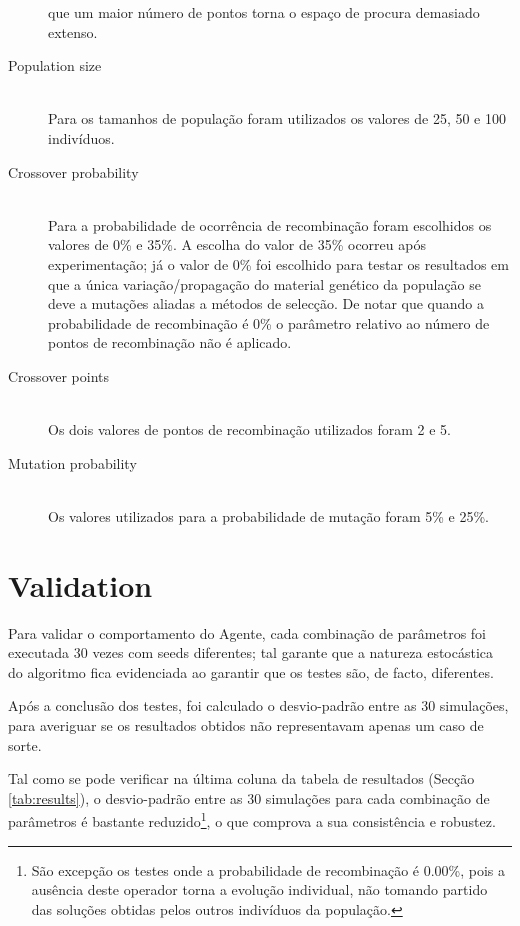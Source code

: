 \documentclass[a4paper]{article}
\begin{document}
\begin{description}
		que um maior número de pontos torna o espaço de procura demasiado extenso.
	\item [Population size] \hfill \\
		\indent Para os tamanhos de população foram utilizados os valores de 25, 50 e 100 indivíduos. %
	\item [Crossover probability] \hfill \\
		\indent Para a probabilidade de ocorrência de recombinação foram escolhidos os valores de 0\% e 35\%. A escolha do valor de 35\% ocorreu após
		experimentação; já o valor de 0\% foi escolhido para testar os resultados em que a única variação/propagação do material genético da população se deve
		a mutações aliadas a métodos de selecção. De notar que quando a probabilidade de recombinação é 0\% o parâmetro relativo ao número de pontos de recombinação
		não é aplicado.
	\item [Crossover points] \hfill \\
		\indent Os dois valores de pontos de recombinação utilizados foram 2 e 5. %
	\item [Mutation probability] \hfill \\
		\indent Os valores utilizados para a probabilidade de mutação foram 5\% e 25\%. %
\end{description}

\cleardoublepage

\section{Validation}
\indent \indent Para validar o comportamento do Agente, cada combinação de parâmetros foi executada 30 vezes com seeds diferentes;
tal garante que a natureza estocástica do algoritmo fica evidenciada ao garantir que os testes são, de facto, diferentes.

Após a conclusão dos testes, foi calculado o desvio-padrão entre as 30 simulações,
para averiguar se os resultados obtidos não representavam apenas um caso de sorte.

Tal como se pode verificar na última coluna da tabela de resultados (Secção \ref{tab:results}), o desvio-padrão entre as 30 simulações para cada combinação de parâmetros
é bastante reduzido\footnote[1]{São excepção os testes onde a probabilidade de recombinação é 0.00\%, pois a ausência deste operador torna a evolução individual,
não tomando partido das soluções obtidas pelos outros indivíduos da população.}, o que comprova a sua consistência e robustez.
\end{document}
